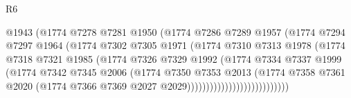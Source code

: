 \begin{lexlean}{R6}
\begin{coremodule}
                                  @1943
                                  (@1774
                                    @7278
                                    @7281
                                    @1950
                                    (@1774
                                      @7286
                                      @7289
                                      @1957
                                      (@1774
                                        @7294
                                        @7297
                                        @1964
                                        (@1774
                                          @7302
                                          @7305
                                          @1971
                                          (@1774
                                            @7310
                                            @7313
                                            @1978
                                            (@1774
                                              @7318
                                              @7321
                                              @1985
                                              (@1774
                                                @7326
                                                @7329
                                                @1992
                                                (@1774
                                                  @7334
                                                  @7337
                                                  @1999
                                                  (@1774
                                                    @7342
                                                    @7345
                                                    @2006
                                                    (@1774
                                                      @7350
                                                      @7353
                                                      @2013
                                                      (@1774
                                                        @7358
                                                        @7361
                                                        @2020
                                                        (@1774
                                                          @7366
                                                          @7369
                                                          @2027
                                                          @2029)))))))))))))))))))))))))))

\end{coremodule}
\end{lexlean}
